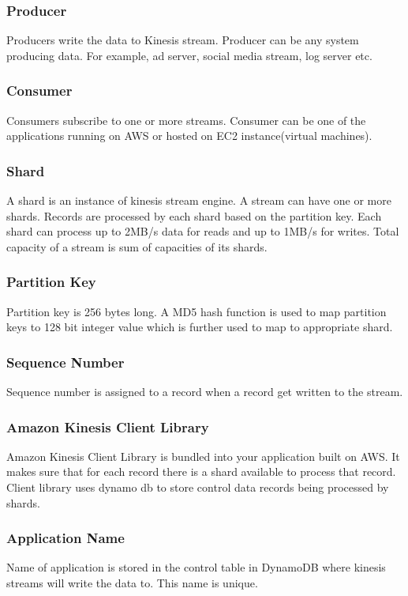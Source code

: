 \documentclass[9pt,twocolumn,twoside]{../../styles/osajnl}
\begin{document}
\subsubsection{Producer}
Producers write the data to Kinesis stream. Producer can be any system producing
data. For example, ad server, social media stream, log server etc.

\subsubsection{Consumer}
Consumers subscribe to one or more streams.  Consumer can be one of the
applications  running on AWS or hosted on EC2\cite{www-aws-ec2} instance(virtual machines).
 
\subsubsection{Shard}
A shard is an instance of kinesis stream engine. A stream can have one or more shards. 
Records are processed by each shard based on the partition key. Each shard can 
process up to 2MB/s data for reads and up to 1MB/s for writes. Total capacity of a 
stream is sum of capacities of its shards.

\subsubsection{Partition Key} 
Partition key is 256 bytes long. A MD5 \cite{rivest1992md5} hash function is used to map partition
keys to 128 bit integer value which is further used to map to appropriate shard.

\subsubsection{Sequence Number}
Sequence number is assigned to a record when a record get written to the stream. 

\subsubsection{Amazon Kinesis Client Library}
Amazon Kinesis Client Library is bundled into your application built on AWS. It
makes sure that for each record there is a shard available to process that
record.  Client library uses dynamo db to store control data records being
processed by shards.

\subsubsection{Application Name}
Name of application is stored in the control table in DynamoDB \cite{www-aws-dynamodb} where kinesis
streams will write the data to. This name is unique.
\end{document}
